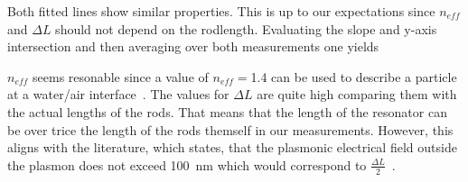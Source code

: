 Both fitted lines show similar properties. This is up to our expectations since $n_{eff}$ and $\Delta L$ should not depend on the rodlength. Evaluating the slope and y-axis intersection and then averaging over both measurements one yields \par 

\centerline{}

$n_{eff}$ seems resonable since a value of $n_{eff} =$1.4 can be used to describe a particle at a water/air interface~\cite{LehrstuhlExperimentalphysikIII.2023}. The values for $\Delta L$ are quite high comparing them with the actual lengths of the rods. That means that the length of the resonator can be over trice the length of the rods themself in our measurements. However, this aligns with the literature, which states, that the plasmonic electrical field outside the plasmon does not exceed \SI{100}{\nano\meter} which would correspond to $\frac{\Delta L}{2}$~\cite{Chen.2013}.